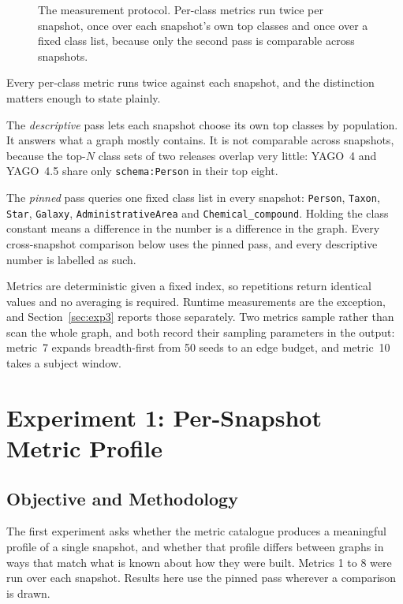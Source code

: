 \begin{figure}[htbp]
  \centering
  \figprotocol
  \caption[]{The measurement protocol. Per-class metrics run
    twice per snapshot, once over each snapshot's own top classes and once over
    a fixed class list, because only the second pass is comparable across
    snapshots.}
  \label{fig:protocol}
\end{figure}

Every per-class metric runs twice against each snapshot, and the distinction
matters enough to state plainly.

The \emph{descriptive} pass lets each snapshot choose its own top classes by
population. It answers what a graph mostly contains. It is not comparable across
snapshots, because the top-$N$ class sets of two releases overlap very little:
YAGO~4 and YAGO~4.5 share only \texttt{schema:Person} in their top eight.

The \emph{pinned} pass queries one fixed class list in every snapshot:
\texttt{Person}, \texttt{Taxon}, \texttt{Star}, \texttt{Galaxy},
\texttt{AdministrativeArea} and \texttt{Chemical\_compound}. Holding the class
constant means a difference in the number is a difference in the graph. Every
cross-snapshot comparison below uses the pinned pass, and every descriptive
number is labelled as such.

Metrics are deterministic given a fixed index, so repetitions return identical
values and no averaging is required. Runtime measurements are the exception,
and Section~\ref{sec:exp3} reports those separately. Two metrics sample rather
than scan the whole graph, and both record their sampling parameters in the
output: metric~7 expands breadth-first from 50 seeds to an edge budget, and
metric~10 takes a subject window.

\section{Experiment 1: Per-Snapshot Metric Profile}
\label{sec:exp1}

\subsection{Objective and Methodology}

The first experiment asks whether the metric catalogue produces a meaningful
profile of a single snapshot, and whether that profile differs between graphs in
ways that match what is known about how they were built. Metrics 1 to 8 were run
over each snapshot. Results here use the pinned pass wherever a comparison is
drawn.

